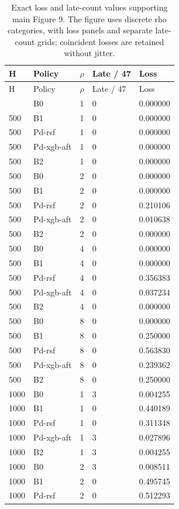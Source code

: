 \documentclass[10pt,a4paper]{article}
\begin{document}
{\scriptsize
\begin{longtable}{@{\extracolsep{\fill}}lllll}
\caption{Exact loss and late-count values supporting main Figure 9. The figure uses discrete rho categories, with loss panels and separate late-count grids; coincident losses are retained without jitter.}\label{tab:discrete_rho}\\
\toprule
H & Policy & $\rho$ & Late / 47 & Loss\\\midrule
\endfirsthead
\toprule
H & Policy & $\rho$ & Late / 47 & Loss\\\midrule
\endhead
\bottomrule\endfoot
500 & B0 & 1 & 0 & 0.000000\\
500 & B1 & 1 & 0 & 0.000000\\
500 & Pd-rsf & 1 & 0 & 0.000000\\
500 & Pd-xgb-aft & 1 & 0 & 0.000000\\
500 & B2 & 1 & 0 & 0.000000\\
500 & B0 & 2 & 0 & 0.000000\\
500 & B1 & 2 & 0 & 0.000000\\
500 & Pd-rsf & 2 & 0 & 0.210106\\
500 & Pd-xgb-aft & 2 & 0 & 0.010638\\
500 & B2 & 2 & 0 & 0.000000\\
500 & B0 & 4 & 0 & 0.000000\\
500 & B1 & 4 & 0 & 0.000000\\
500 & Pd-rsf & 4 & 0 & 0.356383\\
500 & Pd-xgb-aft & 4 & 0 & 0.037234\\
500 & B2 & 4 & 0 & 0.000000\\
500 & B0 & 8 & 0 & 0.000000\\
500 & B1 & 8 & 0 & 0.250000\\
500 & Pd-rsf & 8 & 0 & 0.563830\\
500 & Pd-xgb-aft & 8 & 0 & 0.239362\\
500 & B2 & 8 & 0 & 0.250000\\
1000 & B0 & 1 & 3 & 0.004255\\
1000 & B1 & 1 & 0 & 0.440189\\
1000 & Pd-rsf & 1 & 0 & 0.311348\\
1000 & Pd-xgb-aft & 1 & 3 & 0.027896\\
1000 & B2 & 1 & 3 & 0.004255\\
1000 & B0 & 2 & 3 & 0.008511\\
1000 & B1 & 2 & 0 & 0.495745\\
1000 & Pd-rsf & 2 & 0 & 0.512293\\

\end{longtable}}
\end{document}
